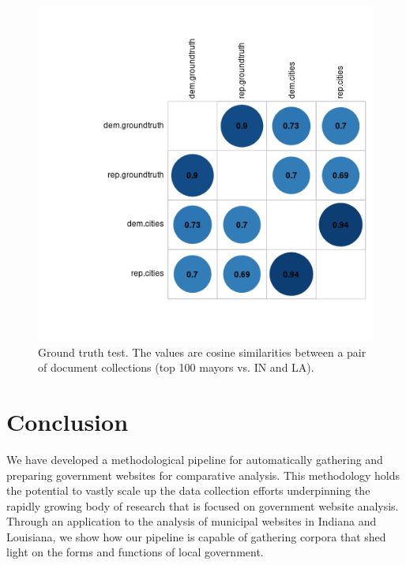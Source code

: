 \documentclass[11pt]{article}
\begin{document}
\begin{figure}[htp]
	\centering %
	\includegraphics[width=\linewidth]{figures/groundtruth_bs_bigcities_corrplot.png}
	\caption{Ground truth test. The values are cosine similarities between a pair of document collections (top 100 mayors vs. IN and LA).}
	\label{groundtruth}
\end{figure}








\section{Conclusion}

We have developed a methodological pipeline for automatically gathering and preparing government websites for comparative analysis. This methodology holds the potential to vastly scale up the data collection efforts underpinning the rapidly growing body of research that is focused on government website analysis. Through an application to the analysis of municipal websites in Indiana and Louisiana, we show how our pipeline is capable of gathering corpora that shed light on the forms and functions of local government.





\newpage

%

\end{document}
